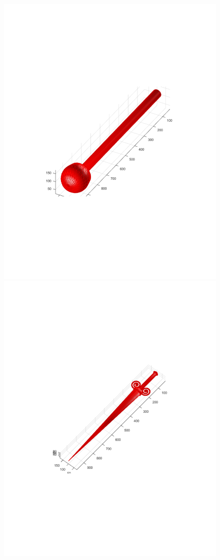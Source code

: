 \documentclass{UCF_ETD}
\begin{document}
\begin{figure}[H]
\begin{center}
\includegraphics[scale=0.34]{RobustRegistration/NoiselessAnomalies6}
\includegraphics[scale=0.34]{RobustRegistration/NoiselessAnomalies7}

\end{center}
\end{figure}
\end{document}
